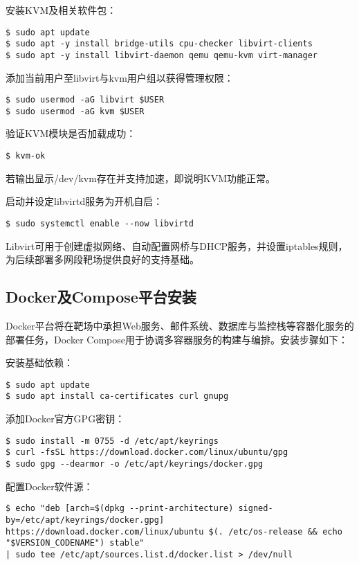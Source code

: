\documentclass[lang=cn,10pt]{elegantbook}
\begin{document}
安装KVM及相关软件包：

\begin{verbatim}
$ sudo apt update
$ sudo apt -y install bridge-utils cpu-checker libvirt-clients 
$ sudo apt -y install libvirt-daemon qemu qemu-kvm virt-manager
\end{verbatim}

添加当前用户至libvirt与kvm用户组以获得管理权限：

\begin{verbatim}
$ sudo usermod -aG libvirt $USER
$ sudo usermod -aG kvm $USER
\end{verbatim}

验证KVM模块是否加载成功：

\begin{verbatim}
$ kvm-ok
\end{verbatim}

若输出显示/dev/kvm存在并支持加速，即说明KVM功能正常。

启动并设定libvirtd服务为开机自启：

\begin{verbatim}
$ sudo systemctl enable --now libvirtd
\end{verbatim}

Libvirt可用于创建虚拟网络、自动配置网桥与DHCP服务，并设置iptables规则，为后续部署多网段靶场提供良好的支持基础。

\subsection{Docker及Compose平台安装}

Docker平台将在靶场中承担Web服务、邮件系统、数据库与监控栈等容器化服务的部署任务，Docker Compose用于协调多容器服务的构建与编排。安装步骤如下：

安装基础依赖：

\begin{verbatim}
$ sudo apt update
$ sudo apt install ca-certificates curl gnupg
\end{verbatim}

添加Docker官方GPG密钥：

\begin{verbatim}
$ sudo install -m 0755 -d /etc/apt/keyrings
$ curl -fsSL https://download.docker.com/linux/ubuntu/gpg
$ sudo gpg --dearmor -o /etc/apt/keyrings/docker.gpg
\end{verbatim}

配置Docker软件源：

\begin{verbatim}
$ echo "deb [arch=$(dpkg --print-architecture) signed-by=/etc/apt/keyrings/docker.gpg]
https://download.docker.com/linux/ubuntu $(. /etc/os-release && echo "$VERSION_CODENAME") stable"
| sudo tee /etc/apt/sources.list.d/docker.list > /dev/null
\end{verbatim}
\end{document}
